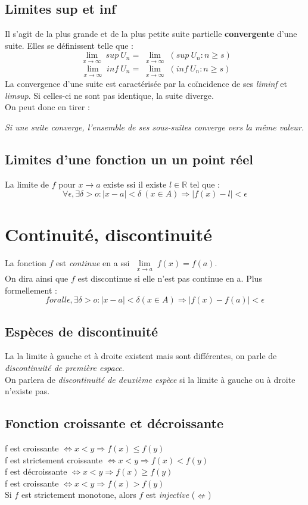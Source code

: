 \documentclass[11pt, a4paper, openany]{book}
\begin{document}
\subsection{Limites sup et inf}
Il s'agit de la plus grande et de la plus petite suite partielle \textbf{convergente} d'une suite. Elles se définissent telle que :
$$ \lim\limits_{\substack{x \to \infty}} sup\ U_{n} = \lim\limits_{\substack{x \to \infty}} (sup\ {U_{n} : n \geq s})$$
$$ \lim\limits_{\substack{x \to \infty}} inf\ U_{n} = \lim\limits_{\substack{x \to \infty}} (inf\ {U_{n} : n \geq s})$$
La convergence d'une suite est caractérisée par la coïncidence de ses \textit{liminf} et \textit{limsup}. Si celles-ci ne sont pas identique, la suite diverge.\\
On peut donc en tirer :\\
\begin{center}
	\textit{Si une suite converge, l'ensemble de ses sous-suites converge vers la même valeur.}
\end{center}

\subsection{Limites d'une fonction un un point réel}
La limite de $f$ pour $x \rightarrow a$ existe ssi il existe $l \in \mathbb{R}$ tel que : 
$$\forall \epsilon, \exists \delta > o : |x-a| < \delta\ (x \in A) \Rightarrow |f(x) - l| < \epsilon$$

\section{Continuité, discontinuité}
La fonction $f$ est \textit{continue} en a ssi $\lim\limits_{\substack{x \to a}} f(x) = f(a)$. \\
On dira ainsi que $f$ est discontinue si elle n'est pas continue en a. Plus formellement : 
$$forall \epsilon, \exists \delta > o : |x-a| < \delta (x \in A) \Rightarrow |f(x) - f(a)| < \epsilon$$

\subsection{Espèces de discontinuité}
La la limite à gauche et à droite existent mais sont différentes, on parle de \textit{discontinuité de première espace}.\\
On parlera de \textit{discontinuité de deuxième espèce} si la limite à gauche ou à droite n'existe pas.

\subsection{Fonction croissante et décroissante}
f est croissante $\Leftrightarrow x < y \Rightarrow f(x) \leq f(y)$\\
f est strictement croissante $\Leftrightarrow x < y \Rightarrow f(x) < f(y)$\\
f est décroissante $\Leftrightarrow x < y \Rightarrow f(x) \geq f(y)$\\
f est croissante $\Leftrightarrow x < y \Rightarrow f(x) > f(y)$\\
Si $f$ est strictement monotone, alors $f$ est \textit{injective} ($\nLeftarrow$)
\end{document}
